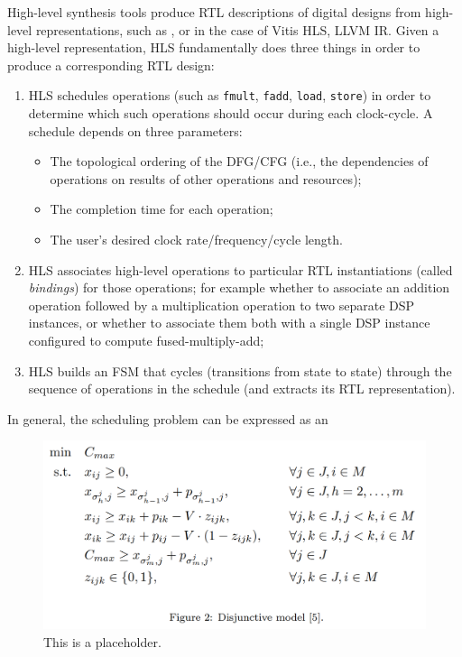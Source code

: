 High-level synthesis tools produce RTL descriptions of digital designs from high-level representations, such as , or in the case of Vitis HLS, LLVM IR.
Given a high-level representation, HLS fundamentally does three things in order to produce a corresponding RTL design: 
\begin{enumerate}
  \item HLS schedules operations (such as \texttt{fmult}, \texttt{fadd}, \texttt{load}, \texttt{store}) in order to determine which such operations should occur during each clock-cycle. A schedule depends on three parameters:
    \begin{itemize} 
      \item The topological ordering of the DFG/CFG (i.e., the dependencies of operations on results of other operations and resources);
      \item The completion time for each operation;
      \item The user's desired clock rate/frequency/cycle length.
    \end{itemize}
  \item HLS associates high-level operations to particular RTL instantiations (called \emph{bindings}) for those operations; for example whether to associate an addition operation followed by a multiplication operation to two separate DSP instances, or whether to associate them both with a single DSP instance configured to compute fused-multiply-add;
  \item HLS builds an FSM that cycles (transitions from state to state) through the sequence of operations in the schedule (and extracts its RTL representation).
\end{enumerate}
In general, the scheduling problem can be expressed as an 
\begin{figure}
  \includegraphics[width=\columnwidth]{figures/schedule.png}
  \caption{This is a placeholder.}
\end{figure}
